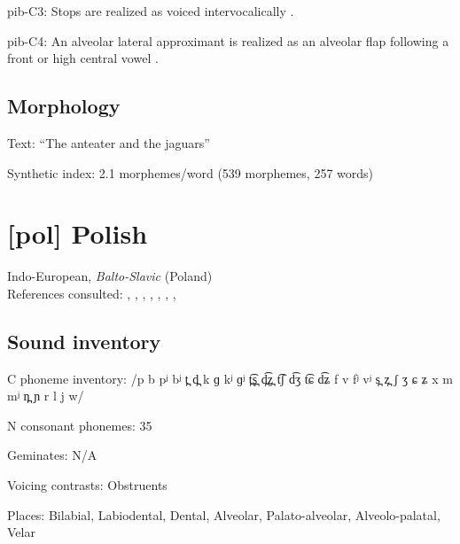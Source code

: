 {\begin{appendixdesc}
\item[pib-C3:] Stops are realized as voiced intervocalically \citep[17]{Hanson2010}.

\item[pib-C4:] An alveolar lateral approximant is realized as an alveolar flap following a front or high central vowel \citep[24]{Hanson2010}.
\end{appendixdesc}
\subsection*{Morphology}

\begin{appendixdesc}

\item[Text:] “The anteater and the jaguars” \citep[379--386]{Hanson2010}

\item[Synthetic index:] 2.1 morphemes/word (539 morphemes, 257 words)
\end{appendixdesc}
\section*{[pol] Polish}   %
Indo-European, \textit{Balto-Slavic} (Poland)\medskip\\
References consulted: \citet{Bargiełowna1950}, \citet{Gussmann2007}, \citet{Jassem2003}, \citet{Newlin-Łukowicz2012}, \citet{Nowak2006}, \citet{Rocławski1976}, \citet{Rubach1974}, \citet{Zydorowicz2010}

\subsection*{Sound inventory}
\begin{appendixdesc}

\item[C phoneme inventory:] /p b pʲ bʲ t̪ d̪ k ɡ kʲ ɡʲ t̪͡s̪ d̪͡z̪ t͡ʃ d͡ʒ t͡ɕ d͡ʑ f v fʲ vʲ s̪ z̪ ʃ ʒ ɕ ʑ x m mʲ n̪ ɲ r l j w/

\item[N consonant phonemes:] 35

\item[Geminates:] N/A

\item[Voicing contrasts:] Obstruents

\item[Places:] Bilabial, Labiodental, Dental, Alveolar, Palato-alveolar, Alveolo-palatal, Velar


\end{appendixdesc}}

